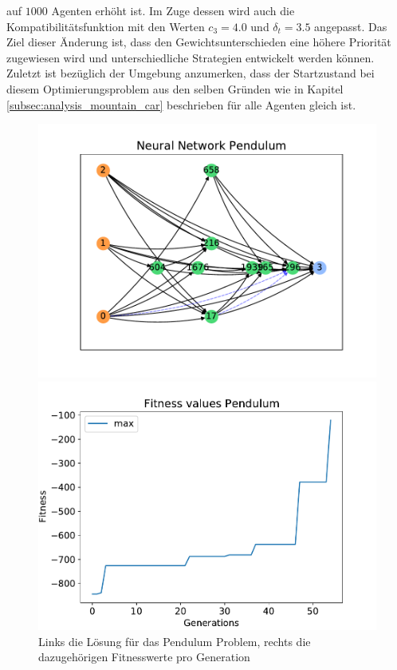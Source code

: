 auf $1000$ Agenten erhöht ist. Im Zuge dessen wird auch die Kompatibilitätsfunktion mit den Werten $c_3=4.0$ und $\delta_t=3.5$ angepasst. Das Ziel dieser Änderung ist, dass den Gewichtsunterschieden eine höhere Priorität zugewiesen wird und unterschiedliche Strategien entwickelt werden können. Zuletzt ist bezüglich der Umgebung anzumerken, dass der Startzustand bei diesem Optimierungsproblem aus den selben Gründen wie in Kapitel \ref{subsec:analysis_mountain_car} beschrieben für alle Agenten gleich ist.  
\begin{figure}[!h]
	\centering
	\begin{minipage}[]{0.49\textwidth}
		\includegraphics[width=1.0\textwidth]{./img/pendulum_single_core/pendulum_1_neural_network.pdf} 
	\end{minipage}
	\hfill
	\begin{minipage}[]{0.49\textwidth}
		\includegraphics[width=1.0\textwidth]{./img/pendulum_single_core/pendulum_1_fitness_values.pdf} 
	\end{minipage}
	\caption{Links die Lösung für das Pendulum Problem, rechts die dazugehörigen Fitnesswerte pro Generation}
	\label{fig:pendulum_car_1core_neural_network_and_fitness}
\end{figure}
